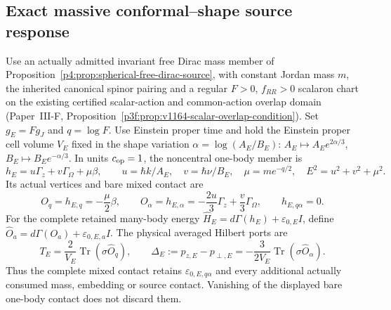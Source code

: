 \documentclass[12pt,a4paper]{article}
\begin{document}



\subsection{Exact massive conformal--shape source response}
\label{p4:sec:v2212-conformal-shape-source}

\begin{corollary}
\label{p4:cor:v2212-massive-conformal-shape-kernel}
Use an actually admitted invariant free Dirac mass member of
Proposition~\ref{p4:prop:spherical-free-dirac-source}, with constant
Jordan mass $m$, the inherited canonical spinor pairing and a regular
$F>0$, $f_{RR}>0$ scalaron chart on the existing certified scalar-action
and common-action overlap domain (Paper~III-F,
Proposition~\ref{p3f:prop:v1164-scalar-overlap-condition}).
Set $g_E=Fg_J$ and $q=\log F$.
Use Einstein proper time and hold the Einstein proper cell volume $V_E$
fixed in the shape variation $\alpha=\log(A_E/B_E)$:
$A_E\mapsto A_Ee^{2\alpha/3}$,
$B_E\mapsto B_Ee^{-\alpha/3}$.
In units $c_{\rm op}=1$, the noncentral one-body member is
\begin{equation}
\label{p4:eq:v2212-conformal-shape-hamiltonian}
 h_E=u\Gamma_z+v\Gamma_\Omega+\mu\beta,\qquad
 u=\hbar k/A_E,\quad v=\hbar\nu/B_E,\quad
 \mu=me^{-q/2},\quad E^2=u^2+v^2+\mu^2.
\end{equation}
Its actual vertices and bare mixed contact are
\begin{equation}
\label{p4:eq:v2212-conformal-shape-vertices}
 \boxed{O_q=h_{E,q}=-\frac\mu2\beta,\qquad
 O_\alpha=h_{E,\alpha}=-\frac{2u}{3}\Gamma_z
                  +\frac v3\Gamma_\Omega,\qquad
 h_{E,q\alpha}=0.}
\end{equation}
For the complete retained many-body energy
$\widehat H_E=d\Gamma(h_E)+\varepsilon_{0,E}I$, define
$\widehat O_a=d\Gamma(O_a)+\varepsilon_{0,E,a}I$.
The physical averaged Hilbert ports are
\begin{equation}
\label{p4:eq:v2212-conformal-shape-ports}
 \boxed{T_E=\frac2{V_E}\operatorname{Tr}(\sigma\widehat O_q),
 \qquad \Delta_E:=p_{z,E}-p_{\perp,E}
 =-\frac3{2V_E}\operatorname{Tr}(\sigma\widehat O_\alpha).}
\end{equation}
Thus the complete mixed contact retains
$\varepsilon_{0,E,q\alpha}$ and every additional actually consumed mass,
embedding or source contact. Vanishing of the displayed bare one-body
contact does not discard them.


\end{corollary}
\end{document}

